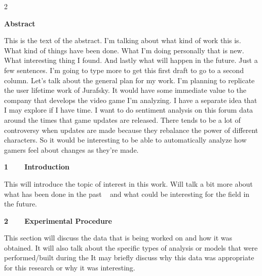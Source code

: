 \documentclass{article}
\newenvironment{changemargin}[2]{%
\begin{list}{}{%
\setlength{\leftmargin}{#1}%
\setlength{\rightmargin}{#2}%
}%
\item[]}
{\end{list}}
\begin{document}
\begin{multicols*}{2} %

\begingroup
	\fontsize{12pt}{12pt}
	\begin{center}
	\textbf{Abstract}
	\end{center}
\endgroup
\begingroup 
	\begin{changemargin}{0.6cm}{0.6cm}
	\fontsize{10pt}{10pt}
	\noindent
	This is the text of the abstract. I'm talking about what kind of work this is. 				What kind of things have been done. What I'm doing personally that is new. What 			interesting thing I found. And lastly what will happen in the future. Just a few 			sentences. I'm going to type more to get this first draft to go to a second column. 		Let's talk about the general plan for my work. I'm planning to replicate the user 			lifetime work of Jurafsky. It would have some immediate value to the company that 			develops the video game I'm analyzing. I have a separate idea that I may explore if I 		have time. I want to do sentiment analysis on this forum data around the times that 		game updates are released. There tends to be a lot of controversy when updates are 			made because they rebalance the power of different characters. So it would be 				interesting to be able to automatically analyze how gamers feel about changes as 			they're made.
	\end{changemargin}
\endgroup


\begingroup
\begin{flushleft}
\fontsize{12pt}{12pt}
\textbf{1~~~~Introduction}
\end{flushleft}
\endgroup
\noindent
This will introduce the topic of interest in this work. Will talk a bit more about what has been done in the past  ~\cite{Leskovec} and what could be interesting for the field in the future.


\begingroup
\begin{flushleft}
\fontsize{12pt}{12pt}
\textbf{2~~~~Experimental Procedure}
\end{flushleft}
\endgroup
\noindent
This section will discuss the data that is being worked on and how it was obtained. It will also talk about the specific types of analysis or models that were performed/built during the It may briefly discuss why this data was appropriate for this research or why it was interesting.



\end{multicols*}
\end{document}
